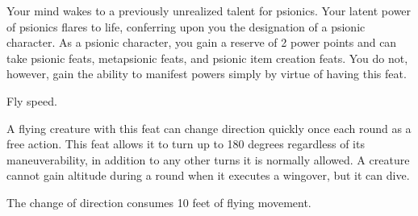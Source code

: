 {Your mind wakes to a previously unrealized talent for psionics.}{}
{Your latent power of psionics flares to life, conferring upon you the designation of a psionic character. As a psionic character, you gain a reserve of 2 power points and can take psionic feats, metapsionic feats, and psionic item creation feats. You do not, however, gain the ability to manifest powers simply by virtue of having this feat.}{}{}

{Fly speed.}
{A flying creature with this feat can change direction quickly once each round as a free action. This feat allows it to turn up to 180 degrees regardless of its maneuverability, in addition to any other turns it is normally allowed. A creature cannot gain altitude during a round when it executes a wingover, but it can dive.

The change of direction consumes 10 feet of flying movement.}